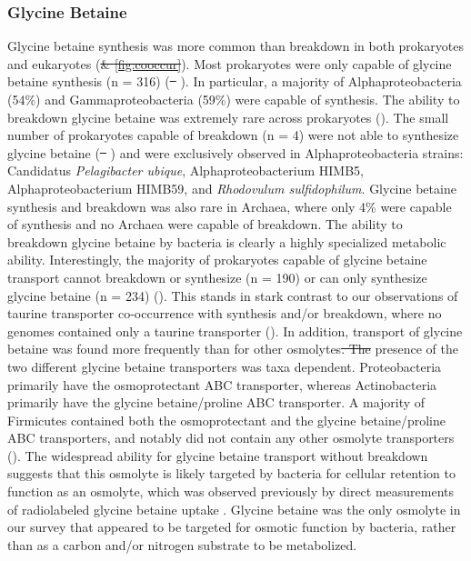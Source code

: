 \documentclass[utf8]{frontiersSCNS} %
\providecommand{\DIFaddtex}[1]{{\protect\color{blue}\uwave{#1}}} %
\providecommand{\DIFdeltex}[1]{{\protect\color{red}\sout{#1}}}                      %
\providecommand{\DIFaddbegin}{} %
\providecommand{\DIFaddend}{} %
\providecommand{\DIFdelbegin}{} %
\providecommand{\DIFdelend}{} %
\providecommand{\DIFadd}[1]{\texorpdfstring{\DIFaddtex{#1}}{#1}} %
\providecommand{\DIFdel}[1]{\texorpdfstring{\DIFdeltex{#1}}{}} %
\begin{document}
\DIFdelend \subsubsection*{Glycine Betaine}
Glycine betaine synthesis was more common than breakdown in both prokaryotes and eukaryotes (\DIFdelbegin \DIFdel{\& \ref{fig:cooccur}}\DIFdelend ). Most prokaryotes were only capable of glycine betaine synthesis (n = 316) (\DIFdelbegin \DIFdel{\mbox{%
}%
}\DIFdelend \DIFaddbegin \DIFadd{\mbox{%
}%
}\DIFaddend ). In particular, a majority of Alphaproteobacteria (54\%) and Gammaproteobacteria (59\%) were capable of synthesis. The ability to breakdown glycine betaine was extremely rare across prokaryotes (). The small number of prokaryotes capable of breakdown (n = 4) were not able to synthesize glycine betaine (\DIFdelbegin \DIFdel{\mbox{%
}%
}\DIFdelend \DIFaddbegin \DIFadd{\mbox{%
}%
}\DIFaddend ) and were exclusively observed in Alphaproteobacteria strains: Candidatus \emph{Pelagibacter ubique}, Alphaproteobacterium HIMB5, Alphaproteobacterium HIMB59, and \emph{Rhodovulum sulfidophilum}. Glycine betaine synthesis and breakdown was also rare in Archaea, where only 4\% were capable of synthesis and no Archaea were capable of breakdown. The ability to breakdown glycine betaine by bacteria is clearly a highly specialized metabolic ability. Interestingly, the majority of prokaryotes capable of glycine betaine transport cannot breakdown or synthesize (n = 190) or can only synthesize glycine betaine (n = 234)  (). This stands in stark contrast to our observations of taurine transporter co-occurrence with synthesis and/or breakdown, where no genomes contained only a taurine transporter (). In addition, transport of glycine betaine was found more frequently than for other osmolytes\DIFdelbegin \DIFdel{. The }\DIFdelend \DIFaddbegin \DIFadd{, and the }\DIFaddend presence of the two different glycine betaine transporters was taxa dependent. Proteobacteria primarily have the osmoprotectant ABC transporter, whereas Actinobacteria primarily have the glycine betaine/proline ABC transporter. A majority of Firmicutes contained both the osmoprotectant and the glycine betaine/proline ABC transporters, and notably did not contain any other osmolyte transporters (). The widespread ability for glycine betaine transport without breakdown suggests that this osmolyte is likely targeted by bacteria for cellular retention to function as an osmolyte, which was observed previously by direct measurements of radiolabeled glycine betaine uptake \citep{Kiene1998}. Glycine betaine was the only osmolyte in our survey that appeared to be targeted for osmotic function by bacteria, rather than as a carbon and/or nitrogen substrate to be metabolized. 
\end{document}
